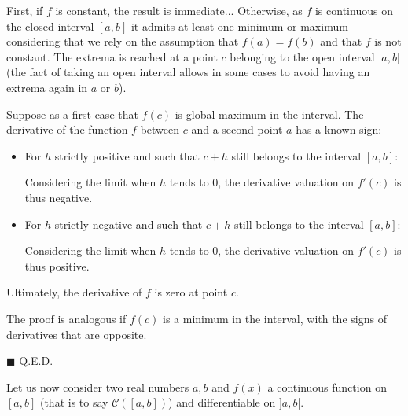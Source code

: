 \begin{dem}
First, if $f$ is constant, the result is immediate... Otherwise, as $f$ is continuous on the closed interval $[a, b]$ it admits at least one minimum or maximum considering that we rely on the assumption that $f(a)=f(b)$ and that $f$ is not constant. The extrema is reached at a point $c$ belonging to the open interval $] a, b [$ (the fact of taking an open interval allows in some cases to avoid having an extrema again in $a$ or $b$).

Suppose as a first case that $f(c)$ is global maximum in the interval. The derivative of the function $f$ between $c$ and a second point $a$ has a known sign:

	\begin{itemize}
		\item For $h$ strictly positive and such that $c + h$ still belongs to the interval $[a, b]$:
	
	Considering the limit when $h$ tends to $0$, the  derivative valuation on $f'(c)$ is thus negative.
	 \item For $h$ strictly negative and such that $c + h$ still belongs to the interval $[a, b]$:
	
	Considering the limit when $h$ tends to $0$, the  derivative valuation on $f'(c)$ is thus positive.
	\end{itemize}
	Ultimately, the derivative of $f$ is zero at point $c$.

		The proof is analogous if $f(c)$ is a minimum in the interval, with the signs of derivatives that are opposite.
		\begin{flushright}
			$\blacksquare$  Q.E.D.
		\end{flushright}
\end{dem}
	Let us now consider two real numbers $a,b$ and $f (x) $ a continuous function on $[a, b]$ (that is to say $\mathcal{C}([a,b])$) and differentiable on $] a, b [$. 


